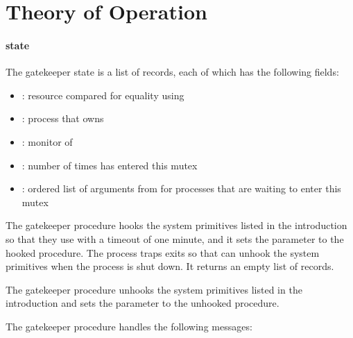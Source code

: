 \section {Theory of Operation}

\paragraph* {state} The gatekeeper state is a
list of 
records, each of which has the following fields:\antipar

\begin{itemize}
\item {}: resource compared for equality using 
\item {}: process that owns 
\item {}: monitor of 
\item {}: number of times  has entered this
  mutex
\item {}: ordered list of  arguments from
   for processes that are waiting to enter this
  mutex
\end{itemize}

 The gatekeeper  procedure
hooks the system primitives listed in the introduction so that they
use  with a timeout of one minute, and it
sets the  parameter to the hooked
 procedure. The process traps exits so that
 can unhook the system primitives when the process is
shut down. It returns an empty list of  records.

 The gatekeeper 
procedure unhooks the system primitives listed in the introduction and
sets the  parameter to the unhooked
 procedure.

 The gatekeeper
 procedure handles the following messages:\antipar

